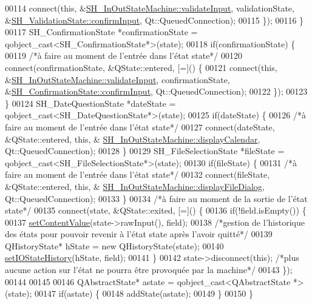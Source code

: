 \begin{DoxyCode}
00114             connect(\textcolor{keyword}{this}, &\hyperlink{classSimpleHotel_1_1SH__InOutStateMachine_a3754990c3f90bb7d59e5028d3d6504d8}{SH\_InOutStateMachine::validateInput}, 
      validationState, &\hyperlink{classSimpleHotel_1_1SH__ConfirmationState_a42814c25df062e1f4cf3929dd9f37a85}{SH\_ValidationState::confirmInput}, Qt::QueuedConnection);
00115         \});
00116     \}
00117     SH\_ConfirmationState *confirmationState = qobject\_cast<SH\_ConfirmationState*>(state);
00118     \textcolor{keywordflow}{if}(confirmationState) \{
00119         \textcolor{comment}{/*à faire au moment de l'entrée dans l'état state*/}
00120         connect(confirmationState, &QState::entered, [=]() \{
00121             connect(\textcolor{keyword}{this}, &\hyperlink{classSimpleHotel_1_1SH__InOutStateMachine_a3754990c3f90bb7d59e5028d3d6504d8}{SH\_InOutStateMachine::validateInput}, 
      confirmationState, &\hyperlink{classSimpleHotel_1_1SH__ConfirmationState_a42814c25df062e1f4cf3929dd9f37a85}{SH\_ConfirmationState::confirmInput}, Qt::QueuedConnection);
00122         \});
00123     \}
00124     SH\_DateQuestionState *dateState = qobject\_cast<SH\_DateQuestionState*>(state);
00125     \textcolor{keywordflow}{if}(dateState) \{
00126         \textcolor{comment}{/*à faire au moment de l'entrée dans l'état state*/}
00127         connect(dateState, &QState::entered, \textcolor{keyword}{this}, &
      \hyperlink{classSimpleHotel_1_1SH__InOutStateMachine_a2801413ae1cf6e87e38e5f5366622860}{SH\_InOutStateMachine::displayCalendar}, Qt::QueuedConnection);
00128     \}
00129     SH\_FileSelectionState *fileState = qobject\_cast<SH\_FileSelectionState*>(state);
00130     \textcolor{keywordflow}{if}(fileState) \{
00131         \textcolor{comment}{/*à faire au moment de l'entrée dans l'état state*/}
00132         connect(fileState, &QState::entered, \textcolor{keyword}{this}, &
      \hyperlink{classSimpleHotel_1_1SH__InOutStateMachine_a034862097f23ae05f9691ae2b45f5d2a}{SH\_InOutStateMachine::displayFileDialog}, Qt::QueuedConnection);
00133     \}
00134     \textcolor{comment}{/*à faire au moment de la sortie de l'état state*/}
00135     connect(state, &QState::exited, [=]() \{
00136         \textcolor{keywordflow}{if}(!field.isEmpty()) \{
00137             \hyperlink{classSimpleHotel_1_1SH__InOutStateMachine_aaf92da452f6cf7cc57aa9e60f88322e4}{setContentValue}(state->rawInput(), field);
00138             \textcolor{comment}{/*gestion de l'historique des états pour pouvoir revenir à l'état state après l'avoir quitté*/}
00139             QHistoryState* hState = \textcolor{keyword}{new} QHistoryState(state);
00140             \hyperlink{classSimpleHotel_1_1SH__InOutStateMachine_a7a6675495f101d29e8eb86df84961795}{setIOStateHistory}(hState, field);
00141         \}
00142         state->disconnect(\textcolor{keyword}{this}); \textcolor{comment}{/*plus aucune action sur l'état ne pourra être provoquée par la machine*/}
00143     \});
00144 
00145 
00146     QAbstractState* astate = qobject\_cast<QAbstractState *>(state);
00147     \textcolor{keywordflow}{if}(astate) \{
00148         addState(astate);
00149     \}
00150 \}
\end{DoxyCode}
